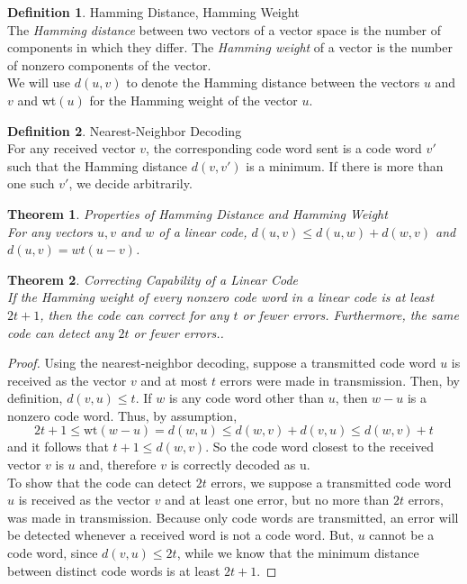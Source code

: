 \documentclass{article}
\newtheorem{theorem}{Theorem}
\theoremstyle{definition}
\newtheorem{definition}{Definition}
\begin{document}
\begin{definition}{Hamming Distance, Hamming Weight}\\The \textit{Hamming distance} between two vectors of a vector space is the number of components in which they differ. The \textit{Hamming weight} of a vector is the number of nonzero components of the vector.\\ We will use $d(u,v)$ to denote the Hamming distance between the vectors $u$ and $v$ and wt$(u)$ for the Hamming weight of the vector $u$.
\end{definition}

\begin{definition}{Nearest-Neighbor Decoding}\\
  For any received vector $v$, the corresponding code word sent is a code word $v'$ such that the Hamming distance $d(v,v')$ is a minimum. If there is more than one such $v'$, we decide arbitrarily.
\end{definition}

\begin{theorem}{Properties of Hamming Distance and Hamming Weight}\\
For any vectors $u,v$ and $w$ of a linear code, $d(u,v)\leq d(u,w)+d(w,v)$ and $d(u,v)=wt(u-v)$.
\end{theorem}

\begin{theorem}{Correcting Capability of a Linear Code}\\
If the Hamming weight of every nonzero code word in a linear code is at least $2t+1$, then the code can correct for any $t$ or fewer errors. Furthermore, the same code can detect any $2t$ or fewer errors..
\end{theorem}
\begin{proof}
  Using the nearest-neighbor decoding, suppose a transmitted code word $u$ is received as the vector $v$ and at most $t$ errors were made in transmission. Then, by definition, $d(v,u)\leq t$. If $w$ is any code word other than $u$, then $w-u$ is a nonzero code word. Thus, by assumption,
  \[2t+1 \leq \text{wt}(w-u) = d(w,u) \leq d(w,v) + d(v,u) \leq d(w,v) + t\]
  and it follows that $t+1 \leq d(w,v).$ So the code word closest to the received vector $v$ is $u$ and, therefore $v$ is correctly decoded as u.\\
  To show that the code can detect $2t$ errors, we suppose a transmitted code word $u$ is received as the vector $v$ and at least one error, but no more than $2t$ errors, was made in transmission. Because only code words are transmitted, an error will be detected whenever a received word is not a code word. But, $u$ cannot be a code word, since $d(v,u) \leq 2t$, while we know that the minimum distance between distinct code words is at least $2t+1$.
\end{proof}
\end{document}
